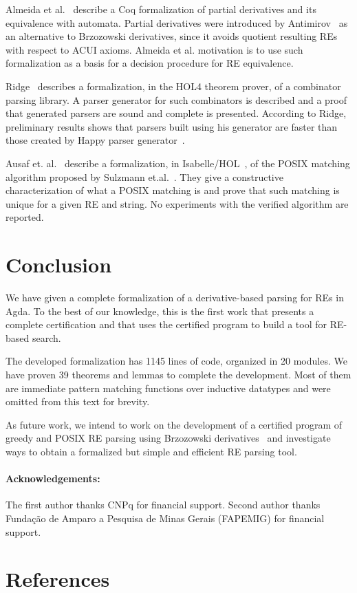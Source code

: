\documentclass[review]{elsarticle}
\begin{document}
Almeida et al.~\cite{AlmeidaMPS10} describe a Coq formalization of
partial derivatives and its equivalence with automata. Partial
derivatives were introduced by Antimirov~\cite{Antimirov91} as an
alternative to Brzozowski derivatives, since it avoids quotient
resulting REs with respect to ACUI axioms. Almeida et al. motivation
is to use such formalization as a basis for a decision procedure for
RE equivalence.

Ridge~\cite{Ridge2011} describes a formalization, in the HOL4 theorem
prover, of a combinator parsing library. A parser generator for such
combinators is described and a proof that generated parsers are sound
and complete is presented.  According to Ridge, preliminary results
shows that parsers built using his generator are faster than those
created by Happy parser generator~\cite{Happy}.

Ausaf et. al.~\cite{AusafDU16} describe a formalization, in
Isabelle/HOL~\cite{Nipkow02}, of the POSIX matching algorithm proposed
by Sulzmann et.al.~\cite{SulzmannL14}. They give a constructive
characterization of what a POSIX matching is and prove that such
matching is unique for a given RE and string. No experiments with the
verified algorithm are reported.


\section{Conclusion}\label{sec:conclusion}

We have given a complete formalization of a derivative-based parsing
for REs in Agda. To the best of our knowledge, this is the first work
that presents a complete certification and that uses the certified
program to build a tool for RE-based search.

The developed formalization has 1145 lines of code, organized in 20
modules. We have proven 39 theorems and lemmas to complete the
development. Most of them are immediate pattern matching functions
over inductive datatypes and were omitted from this text for brevity.

As future work, we intend to work on the development of a certified
program of greedy and POSIX RE parsing using Brzozowski
derivatives~\cite{SulzmannL14,FrischC04} and investigate ways to
obtain a formalized but simple and efficient RE parsing tool.

\paragraph{Acknowledgements:} The first author thanks CNPq for financial
support. Second author thanks Fundação de Amparo a
Pesquisa de Minas Gerais (FAPEMIG) for financial support.

\section*{References}


\end{document}
